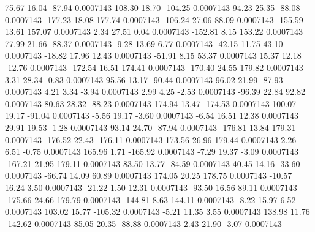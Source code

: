        75.67       16.04      -87.94     0.0007143
      108.30       18.70     -104.25     0.0007143
       94.23       25.35      -88.08     0.0007143
     -177.23       18.08      177.74     0.0007143
     -106.24       27.06       88.09     0.0007143
     -155.59       13.61      157.07     0.0007143
        2.34       27.51        0.04     0.0007143
     -152.81        8.15      153.22     0.0007143
       77.99       21.66      -88.37     0.0007143
       -9.28       13.69        6.77     0.0007143
      -42.15       11.75       43.10     0.0007143
      -18.82       17.96       12.43     0.0007143
      -51.91        8.15       53.37     0.0007143
       15.37       12.18      -12.76     0.0007143
     -172.54       16.51      174.41     0.0007143
     -170.40       24.55      179.82     0.0007143
        3.31       28.34       -0.83     0.0007143
       95.56       13.17      -90.44     0.0007143
       96.02       21.99      -87.93     0.0007143
        4.21        3.34       -3.94     0.0007143
        2.99        4.25       -2.53     0.0007143
      -96.39       22.84       92.82     0.0007143
       80.63       28.32      -88.23     0.0007143
      174.94       13.47     -174.53     0.0007143
      100.07       19.17      -91.04     0.0007143
       -5.56       19.17       -3.60     0.0007143
       -6.54       16.51       12.38     0.0007143
       29.91       19.53       -1.28     0.0007143
       93.14       24.70      -87.94     0.0007143
     -176.81       13.84      179.31     0.0007143
     -176.52       22.43     -176.11     0.0007143
      173.56       26.96      179.44     0.0007143
        2.26        6.51       -0.75     0.0007143
      165.96        1.71     -165.92     0.0007143
       -7.29       19.37       -3.09     0.0007143
     -167.21       21.95      179.11     0.0007143
       83.50       13.77      -84.59     0.0007143
       40.45       14.16      -33.60     0.0007143
      -66.74       14.09       60.89     0.0007143
      174.05       20.25      178.75     0.0007143
      -10.57       16.24        3.50     0.0007143
      -21.22        1.50       12.31     0.0007143
      -93.50       16.56       89.11     0.0007143
     -175.66       24.66      179.79     0.0007143
     -144.81        8.63      144.11     0.0007143
       -8.22       15.97        6.52     0.0007143
      103.02       15.77     -105.32     0.0007143
       -5.21       11.35        3.55     0.0007143
      138.98       11.76     -142.62     0.0007143
       85.05       20.35      -88.88     0.0007143
        2.43       21.90       -3.07     0.0007143
